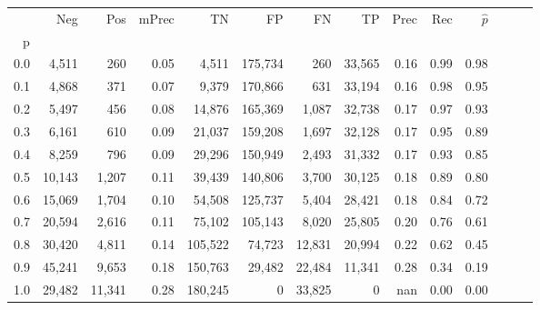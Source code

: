 \begin{tabular}{rrrrrrrrrrrrrr}
\toprule
{} &     Neg &     Pos & mPrec &       TN &       FP &      FN &      TP &  Prec &   Rec & $\hat{p}$ \\
p   &         &         &       &          &          &         &         &       &       &           \\
\midrule
0.0 &   4,511 &     260 &  0.05 &    4,511 &  175,734 &     260 &  33,565 &  0.16 &  0.99 &      0.98 \\
0.1 &   4,868 &     371 &  0.07 &    9,379 &  170,866 &     631 &  33,194 &  0.16 &  0.98 &      0.95 \\
0.2 &   5,497 &     456 &  0.08 &   14,876 &  165,369 &   1,087 &  32,738 &  0.17 &  0.97 &      0.93 \\
0.3 &   6,161 &     610 &  0.09 &   21,037 &  159,208 &   1,697 &  32,128 &  0.17 &  0.95 &      0.89 \\
0.4 &   8,259 &     796 &  0.09 &   29,296 &  150,949 &   2,493 &  31,332 &  0.17 &  0.93 &      0.85 \\
0.5 &  10,143 &   1,207 &  0.11 &   39,439 &  140,806 &   3,700 &  30,125 &  0.18 &  0.89 &      0.80 \\
0.6 &  15,069 &   1,704 &  0.10 &   54,508 &  125,737 &   5,404 &  28,421 &  0.18 &  0.84 &      0.72 \\
0.7 &  20,594 &   2,616 &  0.11 &   75,102 &  105,143 &   8,020 &  25,805 &  0.20 &  0.76 &      0.61 \\
0.8 &  30,420 &   4,811 &  0.14 &  105,522 &   74,723 &  12,831 &  20,994 &  0.22 &  0.62 &      0.45 \\
0.9 &  45,241 &   9,653 &  0.18 &  150,763 &   29,482 &  22,484 &  11,341 &  0.28 &  0.34 &      0.19 \\
1.0 &  29,482 &  11,341 &  0.28 &  180,245 &        0 &  33,825 &       0 &   nan &  0.00 &      0.00 \\
\bottomrule
\end{tabular}
